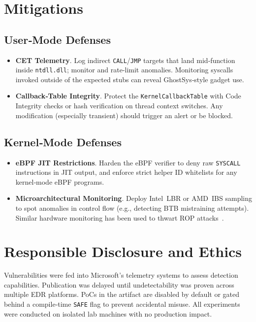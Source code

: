 \documentclass[11pt,letterpaper]{article}
\begin{document}
\section{Mitigations}
\label{sec:mitigations}
\subsection{User‑Mode Defenses}
\begin{itemize}
  \item \textbf{CET Telemetry}. Log indirect \texttt{CALL}/\texttt{JMP} targets that land mid‑function inside \texttt{ntdll.dll}; monitor and rate‑limit anomalies. Monitoring syscalls invoked outside of the expected stubs can reveal GhostSys‑style gadget use.
  \item \textbf{Callback‑Table Integrity}. Protect the \texttt{KernelCallbackTable} with Code Integrity checks or hash verification on thread context switches. Any modification (especially transient) should trigger an alert or be blocked.
\end{itemize}

\subsection{Kernel‑Mode Defenses}
\begin{itemize}
  \item \textbf{eBPF JIT Restrictions}. Harden the eBPF verifier to deny raw \texttt{SYSCALL} instructions in JIT output, and enforce strict helper ID whitelists for any kernel‑mode eBPF programs.
  \item \textbf{Microarchitectural Monitoring}. Deploy Intel LBR or AMD IBS sampling to spot anomalies in control flow (e.g., detecting BTB mistraining attempts). Similar hardware monitoring has been used to thwart ROP attacks~\cite{Pappas2013}.
\end{itemize}

\section{Responsible Disclosure and Ethics}
\label{sec:ethics}
Vulnerabilities were fed into Microsoft's telemetry systems to assess detection capabilities. Publication was delayed until undetectability was proven across multiple EDR platforms. PoCs in the artifact are disabled by default or gated behind a compile‑time \texttt{SAFE} flag to prevent accidental misuse. All experiments were conducted on isolated lab machines with no production impact.
\end{document}
